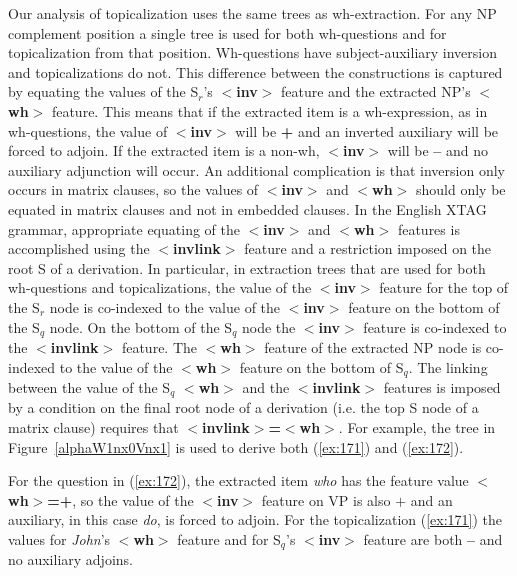 Our analysis of topicalization uses the same trees as wh-extraction.  For any 
NP complement position a single tree is used for both wh-questions and for 
topicalization from that position. Wh-questions have subject-auxiliary 
inversion and topicalizations do not.  This difference between the 
constructions is captured by equating the values of the S$_{r}$'s {\bf $<$inv$>$} feature and the extracted NP's {\bf $<$wh$>$} feature.  This means 
that if the extracted item is a wh-expression, as in wh-questions, the value of 
{\bf $<$inv$>$} will be {\bf +} and an inverted auxiliary will be forced to 
adjoin. If the extracted item is a non-wh, {\bf $<$inv$>$} will be {\bf --} 
and no auxiliary adjunction will occur. An additional complication is that 
inversion only occurs in matrix clauses, so the values of {\bf $<$inv$>$} and 
{\bf $<$wh$>$} should only be equated in matrix clauses and not in embedded 
clauses.  In the English XTAG grammar, appropriate equating of the {\bf $<$inv$>$} and {\bf $<$wh$>$} features is accomplished using the {\bf $<$invlink$>$} feature and a restriction imposed on the root S of a 
derivation. In particular, in extraction trees that are used for both 
wh-questions and topicalizations, the value of the {\bf $<$inv$>$} feature for 
the top of the S$_{r}$ node is co-indexed to the value of the {\bf $<$inv$>$} 
feature on the bottom of the S$_{q}$ node.  On the bottom of the S$_{q}$ node 
the {\bf $<$inv$>$} feature is co-indexed to the {\bf $<$invlink$>$} feature. 
The {\bf $<$wh$>$} feature of the extracted NP node is co-indexed to the value 
of the {\bf $<$wh$>$} feature on the bottom of S$_{q}$. The linking between the 
value of the S$_{q}$ {\bf $<$wh$>$} and the {\bf $<$invlink$>$} features is 
imposed by a condition on the final root node of a derivation (i.e. the top S 
node of a matrix clause) requires that {\bf $<$invlink$>$=$<$wh$>$}.  For 
example, the tree in Figure~\ref{alphaW1nx0Vnx1} is used to 
derive both (\ref{ex:171}) and (\ref{ex:172}). 
 
 
\beginsentences
{}\label{ex:171} 
\label{ex:172} 
\endsentences

 
For the question in (\ref{ex:172}), the extracted item {\it who} has the feature 
value {\bf $<$wh$>$=+}, so the value of the {\bf $<$inv$>$} feature on VP is 
also $+$ and an auxiliary, in this case {\it do}, is forced to adjoin.  For the 
topicalization (\ref{ex:171}) the values for {\it John}'s {\bf $<$wh$>$} feature and 
for S$_{q}$'s {\bf $<$inv$>$} feature are both {\bf --} and no auxiliary 
adjoins. 
 
